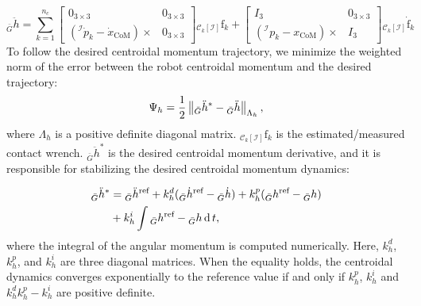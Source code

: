 \begin{equation}
    \label{eq:centroidal_momentum_derivative}
    {}_{\bar{G}} \ddot{h} = \sum_{k = 1}^{n_c} \begin{bmatrix}
  0_{3\times3} & 0_{3\times3} \\
  \left({}^{\mathcal{I}}\dot{p}_k - \dot{x}_\text{CoM}\right)\times & 0_{3\times3}
  \end{bmatrix} {}_{\mathcal{C}_k[\mathcal{I}]}\mathrm{f}_k + \begin{bmatrix}
	I_3 & {0}_{3\times 3} \\
	\left({}^{\mathcal{I}}{p}_k - {x}_\text{CoM}\right)\times & I_3 
	\end{bmatrix} {}_{\mathcal{C}_k[\mathcal{I}]}\dot{\mathrm{f}}_k
\end{equation}
To follow the desired centroidal momentum trajectory, we minimize the weighted norm of the error between the robot centroidal momentum and the desired trajectory:
\begin{equation}
    \Psi_h = \frac{1}{2} \left\lVert{}_{\bar{G}} \ddot{h} ^ * -{}_{\bar{G}} \ddot{h}\right\rVert_{\Lambda_h},
\end{equation}
where $\Lambda _ h$ is a positive definite diagonal matrix. ${}_{\mathcal{C}_k[\mathcal{I}]}\mathrm{f}_k$ is the estimated/measured contact wrench. ${}_{\bar{G}}\ddot{h}^*$ is the desired centroidal momentum derivative, and it is responsible for stabilizing the desired centroidal momentum dynamics:

\begin{equation}
\begin{split}
    {}_{\bar{G}}\ddot{h}^* &= {}_{\bar{G}}\ddot{h}^\text{ref} + k_h^d ({}_{\bar{G}}\dot{h}^\text{ref} - {}_{\bar{G}}\dot{h}) + k_h^p ({}_{\bar{G}} h^\text{ref} - {}_{\bar{G}} h) \\ 
    &+ k_h^i \int {}_{\bar{G}} h^\text{ref} - {}_{\bar{G}} h \operatorname{d} t,
    \end{split}
\end{equation}
where the integral of the angular momentum is computed numerically.
Here, $k^d_h$, $k^p_h$, and $k^i_h$ are three diagonal matrices. When the equality holds, the centroidal dynamics converges exponentially to the reference value if and only if $k^p_h$, $k^i_h$ and $k_h^d k_h^p -k_h^i$ are positive definite.  

